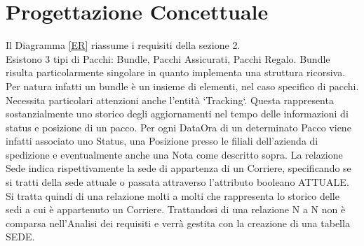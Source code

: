 \section{Progettazione Concettuale}

Il Diagramma \ref{ER} riassume i requisiti della sezione 2.\\ Esistono 3 tipi di Pacchi: Bundle, Pacchi Assicurati, Pacchi Regalo.
Bundle risulta particolarmente singolare in quanto implementa una struttura ricorsiva. Per natura infatti un bundle è un insieme di elementi, nel caso specifico di pacchi.\\
Necessita particolari attenzioni anche l'entità `Tracking`. Questa rappresenta sostanzialmente uno storico degli aggiornamenti nel tempo delle informazioni di status e posizione di un pacco. 
Per ogni DataOra di un determinato Pacco viene infatti associato uno Status, una Posizione presso le filiali dell'azienda di spedizione e eventualmente anche una Nota come descritto sopra. 
La relazione Sede indica rispettivamente la sede di appartenza di un Corriere, specificando se si tratti della sede attuale o passata attraverso l'attributo booleano ATTUALE. Si tratta quindi di una relazione molti a molti che rappresenta lo storico delle sedi a cui è appartenuto un Corriere. Trattandosi di una relazione N a N non è comparsa nell'Analisi dei requisiti e verrà gestita con la creazione di una tabella SEDE.
